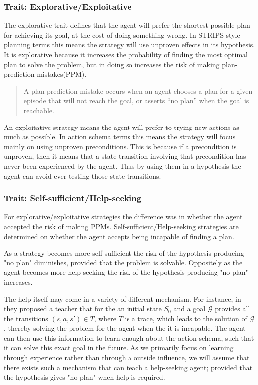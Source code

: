 \documentclass[../Master.tex]{subfiles}
\begin{document}
\subsubsection{Trait: Explorative/Exploitative}
	
	The explorative trait defines that the agent will prefer the shortest possible plan for achieving its goal, 
	at the cost of doing something wrong. 
	In STRIPS-style planning terms this means the strategy will use unproven effects in its hypothesis.
	It is explorative because it increases the probability of finding the most optimal plan to solve the problem, 
	but in doing so increases the risk of making plan-prediction mistakes(PPM).
	\begin{quotation}
				A plan-prediction mistake occurs when an
				agent chooses a plan for a given episode that will not reach
				the goal, or asserts “no plan” when the goal is reachable. \cite{Walsh2008}
	\end{quotation}

	An exploitative strategy means the agent will prefer to trying new actions as much as possible.
	In action schema terms this means the strategy will focus mainly on using unproven preconditions.
	This is because if a precondition is unproven, then it means that a state transition involving that precondition has never been experienced by the agent.
	Thus by using them in a hypothesis the agent can avoid ever testing those state transitions.
	



\subsubsection{Trait: Self-sufficient/Help-seeking}

	For explorative/exploitative strategies the difference was in whether the agent accepted the risk of making PPMs.
	Self-sufficient/Help-seeking strategies are determined on whether the agent accepts being incapable of finding a plan.
	
	As a strategy becomes more self-sufficient the risk of the hypothesis producing "no plan" diminishes, provided that the problem is solvable. 
	Oppositely as the agent becomes more help-seeking the risk of the hypothesis producing "no plan" increases.
	
	The help itself may come in a variety  of different mechanism. 
	For instance, in \cite{Walsh2008} they proposed a teacher that for the an initial state $S_0$ and a goal $\mathcal{G}$ provides all the transitions $(s,a,s') \in T$, where $T$ is a trace, which leads to the solution of $\mathcal{G}$,
	 thereby solving the problem for the agent when the it is incapable. 
	The agent can then use this information to learn enough about the action schema, such that it can solve this exact goal in the future.
	As we primarily focus on learning through experience rather than through a outside influence, we will assume that there exists such a mechanism that can teach a help-seeking agent; 
	provided that the hypothesis gives "no plan" when help is required.
	
\end{document}
